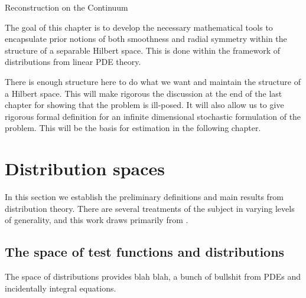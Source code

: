 \setlength{\parindent}{2ex}
\begin{chapter}{Reconstruction on the Continuum}\label{chapter:theoretical}

The goal of this chapter is to develop the necessary mathematical tools to encapsulate prior notions of both smoothness and radial symmetry within the structure of a separable Hilbert space.
This is done within the framework of distributions from linear PDE theory. 

\begin{com}
  There is enough structure here to do what we want and maintain the structure of a Hilbert space. 
  This will make rigorous the discussion at the end of the last chapter for showing that the problem is ill-posed.
  It will also allow us to give rigorous formal definition for an infinite dimensional stochastic formulation of the problem.
  This will be the basis for estimation in the following chapter.
\end{com}

\section{Distribution spaces}
In this section we establish the preliminary definitions and main results from distribution theory.
There are several treatments of the subject in varying levels of generality, and this work draws primarily from \citep{richtmyer1978principles,hormander1983,rudin1991,griffel2002,strichartz2003guide}.

  \subsection{The space of test functions and distributions}

\begin{com}
The space of distributions provides  blah blah, a bunch of bullshit from PDEs and incidentally integral equations.
\end{com}


\end{chapter}
